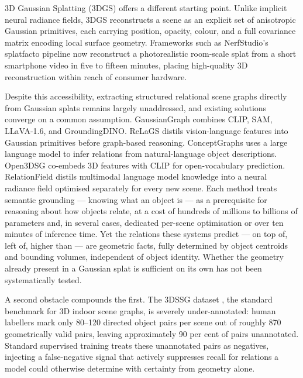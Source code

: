 \documentclass[sn-mathphys,Numbered]{sn-jnl}
\begin{document}
3D Gaussian Splatting (3DGS) \cite{kerbl2023} offers a different starting point. Unlike implicit neural radiance fields, 3DGS reconstructs a scene as an explicit set of anisotropic Gaussian primitives, each carrying position, opacity, colour, and a full covariance matrix encoding local surface geometry. Frameworks such as NerfStudio's splatfacto pipeline \cite{tancik2023} now reconstruct a photorealistic room-scale splat from a short smartphone video in five to fifteen minutes, placing high-quality 3D reconstruction within reach of consumer hardware.

Despite this accessibility, extracting structured relational scene graphs directly from Gaussian splats remains largely unaddressed, and existing solutions converge on a common assumption. GaussianGraph \cite{wang2025gaussiangraph} combines CLIP, SAM, LLaVA-1.6, and GroundingDINO. ReLaGS \cite{xie2026relags} distils vision-language features into Gaussian primitives before graph-based reasoning. ConceptGraphs \cite{gu2023conceptgraphs} uses a large language model to infer relations from natural-language object descriptions. Open3DSG \cite{koch2024open3dsg} co-embeds 3D features with CLIP for open-vocabulary prediction. RelationField \cite{koch2025relationfield} distils multimodal language model knowledge into a neural radiance field optimised separately for every new scene. Each method treats semantic grounding --- knowing what an object is --- as a prerequisite for reasoning about how objects relate, at a cost of hundreds of millions to billions of parameters and, in several cases, dedicated per-scene optimisation or over ten minutes of inference time. Yet the relations these systems predict --- on top of, left of, higher than --- are geometric facts, fully determined by object centroids and bounding volumes, independent of object identity. Whether the geometry already present in a Gaussian splat is sufficient on its own has not been systematically tested.

A second obstacle compounds the first. The 3DSSG dataset \cite{wald2020dsssg}, the standard benchmark for 3D indoor scene graphs, is severely under-annotated: human labellers mark only 80--120 directed object pairs per scene out of roughly 870 geometrically valid pairs, leaving approximately 90 per cent of pairs unannotated. Standard supervised training treats these unannotated pairs as negatives, injecting a false-negative signal that actively suppresses recall for relations a model could otherwise determine with certainty from geometry alone.
\end{document}
